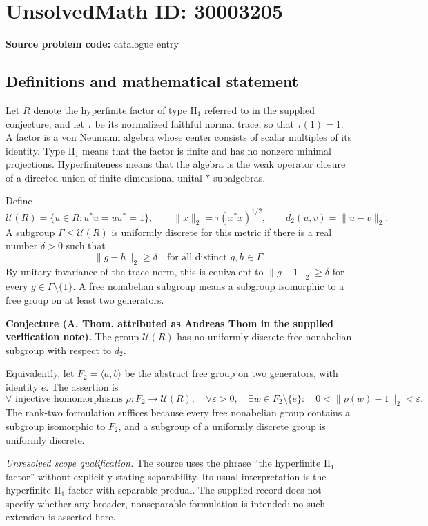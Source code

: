 \documentclass[11pt]{article}
\begin{document}
\section*{UnsolvedMath ID: 30003205}
\textbf{Source problem code:} catalogue entry
\subsection{Definitions and mathematical statement}
Let \(R\) denote the hyperfinite factor of type \(\mathrm{II}_1\) referred to in the supplied conjecture, and let \(\tau\) be its normalized faithful normal trace, so that \(\tau(1)=1\). A factor is a von Neumann algebra whose center consists of scalar multiples of its identity. Type \(\mathrm{II}_1\) means that the factor is finite and has no nonzero minimal projections. Hyperfiniteness means that the algebra is the weak operator closure of a directed union of finite-dimensional unital \(*\)-subalgebras.

Define
\[
\mathcal U(R)=\{u\in R:u^*u=uu^*=1\},\qquad
\|x\|_2=\tau(x^*x)^{1/2},\qquad
 d_2(u,v)=\|u-v\|_2.
\]
A subgroup \(\Gamma\leq\mathcal U(R)\) is uniformly discrete for this metric if there is a real number \(\delta>0\) such that
\[
\|g-h\|_2\geq\delta
\quad\text{for all distinct }g,h\in\Gamma.
\]
By unitary invariance of the trace norm, this is equivalent to \(\|g-1\|_2\geq\delta\) for every \(g\in\Gamma\setminus\{1\}\). A free nonabelian subgroup means a subgroup isomorphic to a free group on at least two generators.

\textbf{Conjecture (A. Thom, attributed as Andreas Thom in the supplied verification note).} The group \(\mathcal U(R)\) has no uniformly discrete free nonabelian subgroup with respect to \(d_2\).

Equivalently, let \(F_2=\langle a,b\rangle\) be the abstract free group on two generators, with identity \(e\). The assertion is
\[
\forall\text{ injective homomorphisms }\rho:F_2\longrightarrow\mathcal U(R),\quad
\forall\varepsilon>0,\quad
\exists w\in F_2\setminus\{e\}:\quad
0<\|\rho(w)-1\|_2<\varepsilon.
\]
The rank-two formulation suffices because every free nonabelian group contains a subgroup isomorphic to \(F_2\), and a subgroup of a uniformly discrete group is uniformly discrete.

\textit{Unresolved scope qualification.} The source uses the phrase ``the hyperfinite \(\mathrm{II}_1\) factor'' without explicitly stating separability. Its usual interpretation is the hyperfinite \(\mathrm{II}_1\) factor with separable predual. The supplied record does not specify whether any broader, nonseparable formulation is intended; no such extension is asserted here.
\end{document}
